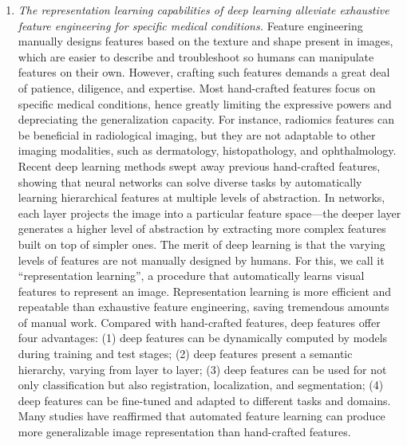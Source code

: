 \begin{enumerate}
    \item \textit{The representation learning capabilities of deep learning alleviate exhaustive feature engineering for specific medical conditions.} Feature engineering manually designs features based on the texture and shape present in images, which are easier to describe and troubleshoot so humans can manipulate features on their own. However, crafting such features demands a great deal of patience, diligence, and expertise. Most hand-crafted features focus on specific medical conditions, hence greatly limiting the expressive powers and depreciating the generalization capacity. For instance, radiomics features can be beneficial in radiological imaging, but they are not adaptable to other imaging modalities, such as dermatology, histopathology, and ophthalmology. Recent deep learning methods swept away previous hand-crafted features, showing that neural networks can solve diverse tasks by automatically learning hierarchical features at multiple levels of abstraction. In networks, each layer projects the image into a particular feature space---the deeper layer generates a higher level of abstraction by extracting more complex features built on top of simpler ones. The merit of deep learning is that the varying levels of features are not manually designed by humans. For this, we call it ``representation learning'', a procedure that automatically learns visual features to represent an image. Representation learning is more efficient and repeatable than exhaustive feature engineering, saving tremendous amounts of manual work. Compared with hand-crafted features, deep features offer four advantages: (1) deep features can be dynamically computed by models during training and test stages; (2) deep features present a semantic hierarchy, varying from layer to layer; (3) deep features can be used for not only classification but also registration, localization, and segmentation; (4) deep features can be fine-tuned and adapted to different tasks and domains. Many studies have reaffirmed that automated feature learning can produce more generalizable image representation than hand-crafted features.
    

\end{enumerate}
